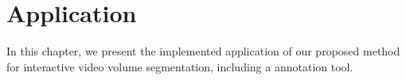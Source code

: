 \chapter{Application}
\label{chap-application}
\begin{ChapAbstract}
In this chapter, we present the implemented application of our proposed method for interactive video volume segmentation, including a annotation tool. 
\end{ChapAbstract}




